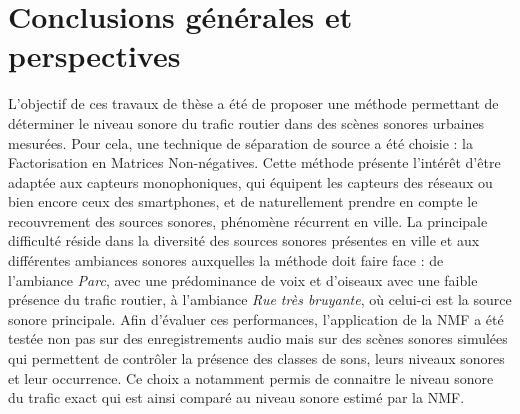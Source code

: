 \chapter*{Conclusions générales et perspectives}
\label{chap:concl}


L'objectif de ces travaux de thèse a été de proposer une méthode permettant de déterminer le niveau sonore du trafic routier dans des scènes sonores urbaines mesurées. Pour cela, une technique de séparation de source a été choisie : la Factorisation en Matrices Non-négatives.
Cette méthode présente l'intérêt d'être adaptée aux capteurs monophoniques, qui équipent les capteurs des réseaux ou bien encore ceux des smartphones, et de naturellement prendre en compte le recouvrement des sources sonores, phénomène récurrent en ville.
La principale difficulté réside dans la diversité des sources sonores présentes en ville et aux différentes ambiances sonores auxquelles la méthode doit faire face : de l'ambiance \textit{Parc}, avec une prédominance de voix et d'oiseaux avec une faible présence du trafic routier, à l'ambiance \textit{Rue très bruyante}, où celui-ci est la source sonore principale.
Afin d'évaluer ces performances, l'application de la NMF a été testée non pas sur des enregistrements audio mais sur des scènes sonores simulées qui permettent de contrôler la présence des classes de sons, leurs niveaux sonores et leur occurrence. Ce choix a notamment permis de connaitre le niveau sonore du trafic exact qui est ainsi comparé au niveau sonore estimé par la NMF.

